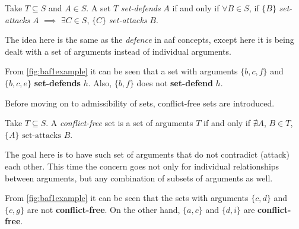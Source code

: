             \begin{definition}
                Take $T \subseteq S$ and $A \in S$. A set $T$ \textit{set-defends} $A$ if and only if $\forall B \in S$, if $\{B\}$ \textit{set-attacks} $A$ $\implies$ $\exists C \in S$, $\{C\}$ \textit{set-attacks} $B$.
                \label{definition:definition15}
            \end{definition}
            
            The idea here is the same as the \textit{defence} in \gls{aaf} concepts, except here it is being dealt with a set of arguments instead of individual arguments.
            
            \begin{exa}
                From \autoref{fig:baf1example} it can be seen that a set with arguments $\{b, c, f\}$ and $\{b, c, e\}$ \textbf{set-defends} $h$. Also, $\{b, f\}$ does not \textbf{set-defend} $h$.
                \label{exa:example13}
            \end{exa}
            
            Before moving on to admissibility of sets, conflict-free sets are introduced.
            
            \begin{definition}
                Take $T \subseteq S$. A \textit{conflict-free} set is a set of arguments $T$ if and only if $\nexists A$, $B \in T$, $\{A\} \text{ set-attacks } B$.
                \label{definition:definition16}
            \end{definition}
            
            The goal here is to have such set of arguments that do not contradict (attack) each other. This time the concern goes not only for individual relationships between arguments, but any combination of subsets of arguments as well.
            
            \begin{exa}
                From \autoref{fig:baf1example} it can be seen that the sets with arguments $\{c, d\}$ and $\{c, g\}$ are not \textbf{conflict-free}. On the other hand, $\{a, c\}$ and $\{d, i\}$ are \textbf{conflict-free}.
                \label{exa:example14}
            \end{exa}
            
            
